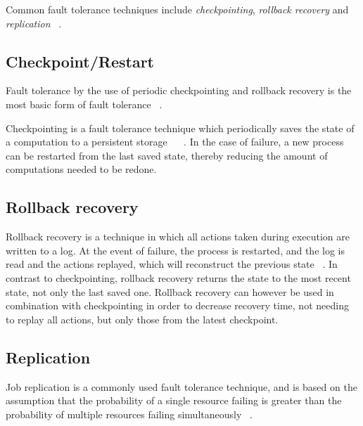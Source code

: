 \documentclass{cslthse-msc}
\begin{document}
Common fault tolerance techniques include \emph{checkpointing}, \emph{rollback recovery} and \emph{replication} ~\cite{relGridSystems}.

\subsection{Checkpoint/Restart} \label{subsec:background_checkpoint}
Fault tolerance by the use of periodic checkpointing and rollback recovery is the most basic form of fault tolerance ~\cite{surveyFaultParallel}.

Checkpointing is a fault tolerance technique which periodically saves the state of a computation to a persistent storage ~\cite{relGridSystems} ~\cite{surveyFaultParallel}. In the case of failure, a new process can be restarted from the last saved state, thereby reducing the amount of computations needed to be redone.


\subsection{Rollback recovery} \label{subsec:background_rollback}
Rollback recovery is a technique in which all actions taken during execution are written to a log. At the event of failure, the process is restarted, and the log is read and the actions replayed, which will reconstruct the previous state ~\cite{surveyFaultParallel}. In contrast to checkpointing, rollback recovery returns the state to the most recent state, not only the last saved one. Rollback recovery can however be used in combination with checkpointing in order to decrease recovery time, not needing to replay all actions, but only those from the latest checkpoint.

\subsection{Replication} \label{subsec:background_replication}
Job replication is a commonly used fault tolerance technique, and is based on the assumption that the probability of a single resource failing is greater than the probability of multiple resources failing simultaneously ~\cite{faultToleranceGrid}.
\end{document}
